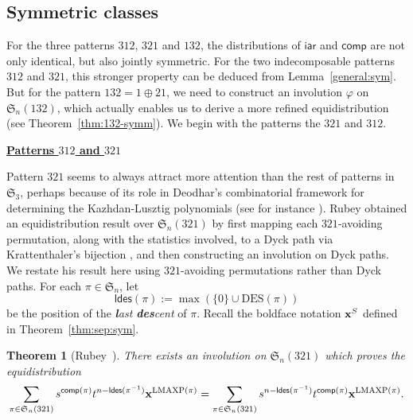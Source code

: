 \documentclass[12pt]{amsart}
\numberwithin{equation}{section}
\theoremstyle{plain}
\newtheorem{theorem}{Theorem}[section]
\theoremstyle{definition}
\def\S{\mathfrak{S}}
\def\iar{\mathsf{iar}}
\def\comp{\mathsf{comp}}
\def\DES{\mathrm{DES}}
\def\LMAXP{\mathrm{LMAXP}}
\def\ldes{\mathsf{ldes}}
\begin{document}
\subsection{Symmetric classes}\label{sym:3.1}
For the three patterns $312$, $321$ and $132$, the distributions of $\iar$ and $\comp$ are not only identical, but also jointly symmetric. For the two indecomposable patterns $312$ and $321$, this stronger property can be deduced from Lemma~\ref{general:sym}. But for the pattern $132=1\oplus 21$, we need to construct an involution $\varphi$ on $\S_n(132)$, which actually enables us to derive a more refined equidistribution (see Theorem~\ref{thm:132-symm}). We begin with the patterns the $321$ and $312$.





\medskip
\noindent \underline{\bf Patterns $312$ and $321$}
\medskip

Pattern $321$ seems to always attract more attention than the rest of patterns in $\S_3$, perhaps because of its role in Deodhar's combinatorial framework for determining the Kazhdan-Lusztig polynomials (see for instance \cite{BW}). Rubey \cite{rub} obtained an equidistribution result over $\S_n(321)$ by first mapping each $321$-avoiding permutation, along with the statistics involved, to a Dyck path via Krattenthaler's bijection \cite{kra}, and then constructing an involution on Dyck paths. We restate his result here using $321$-avoiding permutations rather than Dyck paths. For each $\pi\in\S_n$, let 
$$\ldes(\pi):=\max(\{0\}\cup\DES(\pi))
$$
be the position of the {\em {\bf\em l}ast {\bf\em des}cent} of $\pi$. Recall the boldface notation ${\bf x}^S$ defined in Theorem~\ref{thm:sep:sym}.
\begin{theorem}[Rubey~\cite{rub}]\label{thm:Rubey}
There exists an involution on $\S_n(321)$ which proves the equidistribution
\begin{equation}\label{equ:rubey}
\sum_{\pi\in\S_n(321)}s^{\comp(\pi)}t^{n-\ldes(\pi^{-1})}{\bf x}^{\LMAXP(\pi)}=\sum_{\pi\in\S_n(321)}s^{n-\ldes(\pi^{-1})}t^{\comp(\pi)}{\bf x}^{\LMAXP(\pi)}.
\end{equation}
\end{theorem} 
\end{document}
